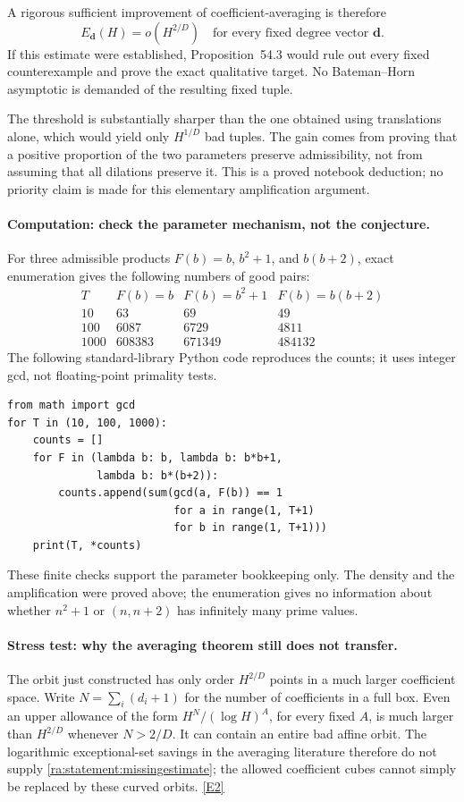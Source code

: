 \documentclass[11pt]{article}
\newcommand{\eref}[2]{\hyperlink{extra:#1:#2}{[E#2]}}
\begin{document}
A rigorous sufficient improvement of coefficient-averaging is therefore
\begin{equation}\label{ra:statement:missingestimate}
 \boxed{\quad E_{\mathbf d}(H)=o(H^{2/D})
 \quad\text{for every fixed degree vector }\mathbf d.\quad}
\end{equation}
If this estimate were established, Proposition~54.3 would rule out every
fixed counterexample and prove the exact qualitative target. No
Bateman--Horn asymptotic is demanded of the resulting fixed tuple.

The threshold is substantially sharper than the one obtained using
translations alone, which would yield only $H^{1/D}$ bad tuples.
The gain comes from proving that a positive proportion of the two
parameters preserve admissibility, not from assuming that all dilations
preserve it. This is a proved notebook deduction; no priority claim is
made for this elementary amplification argument.

\paragraph{Computation: check the parameter mechanism, not the conjecture.}
For three admissible products $F(b)=b$, $b^2+1$, and $b(b+2)$,
exact enumeration gives the following numbers of good pairs:
\[
\begin{array}{c|rrr}
 T & F(b)=b & F(b)=b^2+1 & F(b)=b(b+2)\\\hline
 10&63&69&49\\
 100&6087&6729&4811\\
 1000&608383&671349&484132
\end{array}
\]
The following standard-library Python code reproduces the counts; it
uses integer gcd, not floating-point primality tests.
\begin{verbatim}
from math import gcd
for T in (10, 100, 1000):
    counts = []
    for F in (lambda b: b, lambda b: b*b+1,
              lambda b: b*(b+2)):
        counts.append(sum(gcd(a, F(b)) == 1
                          for a in range(1, T+1)
                          for b in range(1, T+1)))
    print(T, *counts)
\end{verbatim}
These finite checks support the parameter bookkeeping only. The density
and the amplification were proved above; the enumeration gives no
information about whether $n^2+1$ or $(n,n+2)$ has infinitely many prime
values.

\paragraph{Stress test: why the averaging theorem still does not transfer.}
The orbit just constructed has only order $H^{2/D}$ points in a much
larger coefficient space. Write $N=\sum_i(d_i+1)$ for the number of
coefficients in a full box. Even an upper allowance of the form
$H^N/(\log H)^A$, for every fixed $A$, is much larger than
$H^{2/D}$ whenever $N>2/D$. It can contain an entire bad affine orbit.
The logarithmic exceptional-set savings in the averaging literature
therefore do not supply \eqref{ra:statement:missingestimate}; the allowed
coefficient cubes cannot simply be replaced by these curved orbits.
\eref{statement}{2}
\end{document}
